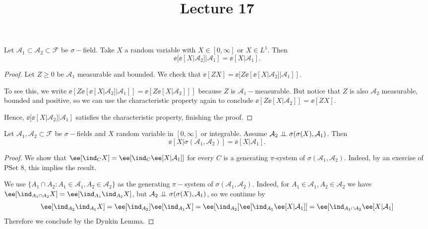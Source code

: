 \documentclass[../main.tex]{subfiles}
\title{Lecture 17}
\begin{document}
\begin{proposition}
  Let $\mathcal{A}_1 \subset \mathcal{A}_2 \subset \mathcal{F}$ be $\sigma-$field. Take 
  $X$ a random variable with $X \in [0, \infty]$ or $X \in L^1$. Then
  \[
    \ee[\ee[X | \mathcal{A}_2] | \mathcal{A}_1] = \ee[X | \mathcal{A}_1]
  .\] 
\end{proposition}
\begin{proof}
    Let $Z \geq 0$ be $\mathcal{A}_1$ measurable and bounded. We check that
    $\ee[ZX] = \ee[Z\ee[\ee[X | \mathcal{A}_2] | \mathcal{A}_1]]$.

    To see this, we write
    $\ee[Z\ee[\ee[X | \mathcal{A}_2] | \mathcal{A}_1]] = \ee[Z \ee[X |
    \mathcal{A}_2]]]$ because $Z$ is $\mathcal{A}_1-$measurable. But notice that
    $Z$ is also $\mathcal{A}_2$ measurable, bounded and positive, so we can use
    the characteristic property again to conclude $\ee[Z \ee[X | \mathcal{A}_2]]
    = \ee[ZX]$.

    Hence, $\ee[\ee[X | \mathcal{A}_2] | \mathcal{A}_1]$ satisfies the
    characteristic property, finishing the proof.
\end{proof}

\begin{lemma}
    Let $\mathcal{A}_1, \mathcal{A}_2 \subset \mathcal{F}$ be $\sigma-$fields
    and $X$ random variable in $[0, \infty]$ or integrable. Assume
    $\mathcal{A}_2 \perp\!\!\!\!\,\perp \sigma(\sigma(X), \mathcal{A}_1)$. Then
    \[
      \ee[X | \sigma(\mathcal{A}_1, \mathcal{A}_2)] = \ee[X | \mathcal{A}_1]
    .\] 
\end{lemma}
\begin{proof}
  We show that $\ee[\ind_C X] = \ee[\ind_C \ee[X | \mathcal{A}_1]]$ for every
  $C$ is a generating $\pi$-system of $\sigma(\mathcal{A}_1, \mathcal{A}_2)$.
  Indeed, by an exercise of PSet 8, this implies the result.

  We use $\{ A_1 \cap A_2 \colon A_1 \in \mathcal{A}_1, A_2 \in \mathcal{A}_2 \}
  $ as the generating $\pi-$system of $\sigma(\mathcal{A}_1, \mathcal{A}_2)$.
  Indeed, for $A_1 \in \mathcal{A}_1, A_2 \in \mathcal{A}_2$ we have 
  $\ee[\ind_{A_1 \cap A_2} X] = \ee[\ind_{A_1} \ind_{A_2} X]$, but
  $\mathcal{A}_2 \perp\!\!\!\!\,\perp \sigma(\sigma(X), \mathcal{A}_1)$, so 
  we continue by 
  $$\ee[\ind_{A_2} \ind_{A_1} X] = \ee[\ind_{A_2}] \ee[\ind_{A_1}
  X] = \ee[\ind_{A_2}] \ee[\ind_{A_1} \ee[X | \mathcal{A}_1]] = \ee[\ind_{A_1
  \cap A_2} \ee[X | \mathcal{A}_1]$$
  Therefore we conclude by the Dynkin Lemma.
\end{proof}
\end{document}
